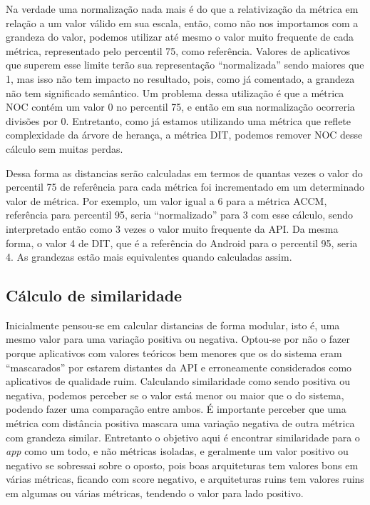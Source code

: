 Na verdade uma normalização nada mais é do que a relativização da métrica em relação a um valor válido em sua escala, então, como não nos importamos com a grandeza do valor, podemos utilizar até mesmo o valor muito frequente de cada métrica, representado pelo percentil 75, como referência. Valores de aplicativos que superem esse limite terão sua representação ``normalizada'' sendo maiores que 1, mas isso não tem impacto no resultado, pois, como já comentado, a grandeza não tem significado semântico. Um problema dessa utilização é que a métrica NOC contém um valor 0 no percentil 75, e então em sua normalização ocorreria divisões por 0. Entretanto, como já estamos utilizando uma métrica que reflete complexidade da árvore de herança, a métrica DIT, podemos remover NOC desse cálculo sem muitas perdas.

Dessa forma as distancias serão calculadas em termos de quantas vezes o valor do percentil 75 de referência para cada métrica foi incrementado em um determinado valor de métrica. Por exemplo, um valor igual a 6 para a métrica ACCM, referência para percentil 95, seria ``normalizado'' para 3 com esse cálculo, sendo interpretado então como 3 vezes o valor muito frequente da API. Da mesma forma, o valor 4 de DIT, que é a referência do Android para o percentil 95, seria 4. As grandezas estão mais equivalentes quando calculadas assim.

\subsection{Cálculo de similaridade}

Inicialmente pensou-se em calcular distancias de forma modular, isto é, uma mesmo valor para uma variação positiva ou negativa. Optou-se por não o fazer porque aplicativos com valores teóricos bem menores que os do sistema eram ``mascarados'' por estarem distantes da API e erroneamente considerados como aplicativos de qualidade ruim.  Calculando similaridade como sendo positiva ou negativa, podemos perceber se o valor está menor ou maior que o do sistema, podendo fazer uma comparação entre ambos. É importante perceber que uma métrica com distância positiva mascara uma variação negativa de outra métrica com grandeza similar. Entretanto o objetivo aqui é encontrar similaridade para o \textit{app} como um todo, e não métricas isoladas, e geralmente um valor positivo ou negativo se sobressai sobre o oposto, pois boas arquiteturas tem valores bons em várias métricas, ficando com score negativo, e arquiteturas ruins tem valores ruins em algumas ou várias métricas, tendendo o valor para lado positivo. 

